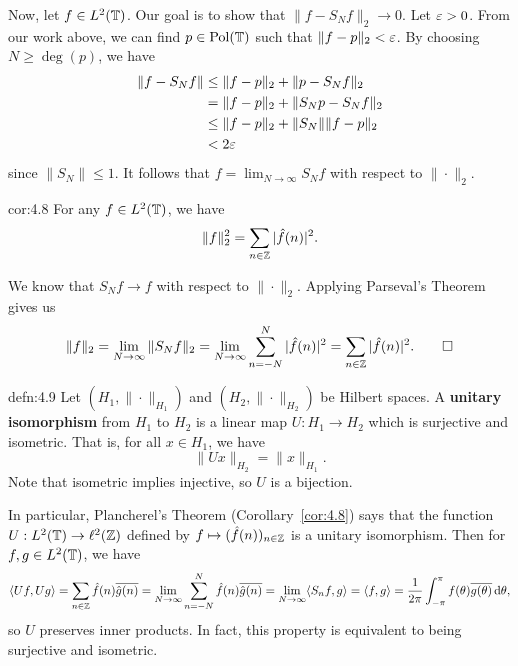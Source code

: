 \begin{pf}
    Now, let $f \in L^2(\mathbb{T})$. Our goal is to show that $\|f - S_Nf\|_2 \to 0$. 
    Let $\varepsilon > 0$. From our work above, we can find $p \in \operatorname{Pol}(\mathbb{T})$ 
    such that $\|f - p\|_2 < \varepsilon$. By choosing $N \geq \deg(p)$, we have 
    \begin{align*}
        \|f - S_Nf\| &\leq \|f - p\|_2 + \|p - S_Nf\|_2 \\ 
        &= \|f - p\|_2 + \|S_Np - S_Nf\|_2 \\ 
        &\leq \|f - p\|_2 + \|S_N\| \|f - p\|_2 \\ 
        &< 2\varepsilon 
    \end{align*}
    since $\|S_N\| \leq 1$. It follows that $f = \lim_{N\to\infty} S_Nf$ 
    with respect to $\|\cdot\|_2$. 
\end{pf}

\begin{cor}{cor:4.8}
    For any $f \in L^2(\mathbb{T})$, we have 
    \[ \|f\|_2^2 = \sum_{n\in\mathbb{Z}} |\hat f(n)|^2. \] 
\end{cor}
\begin{pf}
    We know that $S_Nf \to f$ with respect to $\|\cdot\|_2$. Applying 
    Parseval's Theorem gives us 
    \[ \|f\|_2 = \lim_{N\to\infty} \|S_N f\|_2 
    = \lim_{N\to\infty} \sum_{n=-N}^N |\hat f(n)|^2 = 
    \sum_{n\in\mathbb{Z}} |\hat f(n)|^2. \qedhere \] 
\end{pf}

\begin{defn}{defn:4.9}
    Let $(H_1, \|\cdot\|_{H_1})$ and $(H_2, \|\cdot\|_{H_2})$ be Hilbert 
    spaces. A {\bf unitary isomorphism} from $H_1$ to $H_2$ is a 
    linear map $U : H_1 \to H_2$ which is surjective and isometric. That is, 
    for all $x \in H_1$, we have 
    \[ \|Ux\|_{H_2} = \|x\|_{H_1}. \] 
    Note that isometric implies injective, so $U$ is a bijection. 
\end{defn}

In particular, Plancherel's Theorem (Corollary~\ref{cor:4.8}) says that 
the function $U : L^2(\mathbb{T}) \to \ell^2(\mathbb{Z})$ defined by $f \mapsto 
(\hat f(n))_{n\in\mathbb{Z}}$ is a unitary isomorphism. Then for 
$f, g \in L^2(\mathbb{T})$, we have 
\[ \langle Uf, Ug \rangle = \sum_{n\in\mathbb{Z}} \hat f(n) \overline{\hat g(n)} 
= \lim_{N\to\infty} \sum_{n=-N}^N \hat f(n) \overline{\hat g(n)} 
= \lim_{N\to\infty} \langle S_n f, g \rangle 
= \langle f, g \rangle 
= \frac{1}{2\pi} \int_{-\pi}^\pi f(\theta) \overline{g(\theta)} \,\mathrm{d}\theta, \] 
so $U$ preserves inner products. In fact, this property is equivalent to being 
surjective and isometric. 

